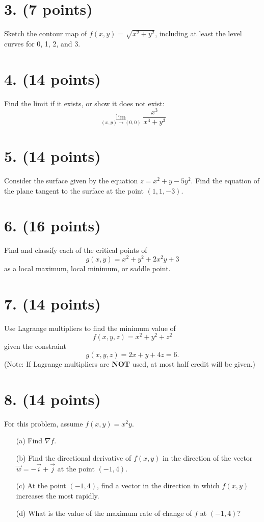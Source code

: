 \documentclass[12pt]{article}
\begin{document}
\section*{3. (7 points)}
Sketch the contour map of \( f(x, y) = \sqrt{x^2 + y^2} \), including at least the level curves for 0, 1, 2, and 3.

\section*{4. (14 points)}
Find the limit if it exists, or show it does not exist:
\[
\lim_{(x, y) \to (0, 0)} \frac{x^3}{x^3 + y^3}
\]

\section*{5. (14 points)}
Consider the surface given by the equation \( z = x^2 + y - 5y^2 \). Find the equation of the plane tangent to the surface at the point \( (1, 1, -3) \).

\section*{6. (16 points)}
Find and classify each of the critical points of 
\[
g(x, y) = x^2 + y^2 + 2x^2 y + 3
\]
as a local maximum, local minimum, or saddle point.

\section*{7. (14 points)}
Use Lagrange multipliers to find the minimum value of 
\[
f(x, y, z) = x^2 + y^2 + z^2
\]
given the constraint 
\[
g(x, y, z) = 2x + y + 4z = 6.
\]
(Note: If Lagrange multipliers are \textbf{NOT} used, at most half credit will be given.)

\section*{8. (14 points)}
For this problem, assume \( f(x, y) = x^2 y \).
\begin{enumerate}
    \item[(a)] Find \( \nabla f \).
    \item[(b)] Find the directional derivative of \( f(x, y) \) in the direction of the vector \( \vec{w} = -\vec{i} + \vec{j} \) at the point \( (-1, 4) \).
    \item[(c)] At the point \( (-1, 4) \), find a vector in the direction in which \( f(x, y) \) increases the most rapidly.
    \item[(d)] What is the value of the maximum rate of change of \( f \) at \( (-1, 4) \)?
\end{enumerate}
\end{document}

